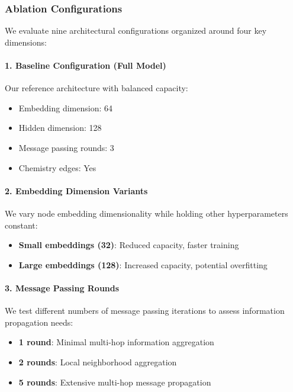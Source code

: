 \subsubsection{Ablation Configurations}
\label{subsubsec:gnn_ablation_configs}

We evaluate nine architectural configurations organized around four key dimensions:

\paragraph{1. Baseline Configuration (Full Model)}
Our reference architecture with balanced capacity:
\begin{itemize}[noitemsep]
    \item Embedding dimension: 64
    \item Hidden dimension: 128
    \item Message passing rounds: 3
    \item Chemistry edges: Yes
\end{itemize}

\paragraph{2. Embedding Dimension Variants}
We vary node embedding dimensionality while holding other hyperparameters constant:
\begin{itemize}[noitemsep]
    \item \textbf{Small embeddings (32)}: Reduced capacity, faster training
    \item \textbf{Large embeddings (128)}: Increased capacity, potential overfitting
\end{itemize}

\paragraph{3. Message Passing Rounds}
We test different numbers of message passing iterations to assess information propagation needs:
\begin{itemize}[noitemsep]
    \item \textbf{1 round}: Minimal multi-hop information aggregation
    \item \textbf{2 rounds}: Local neighborhood aggregation
    \item \textbf{5 rounds}: Extensive multi-hop message propagation
\end{itemize}

